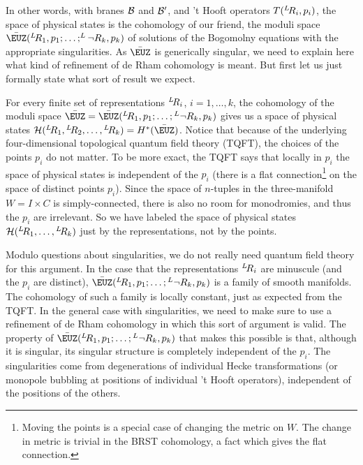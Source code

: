 In other words, with branes ${\cal B}$ and ${\cal B}'$, and 't
Hooft operators $T(^L\negthinspace R_i,p_i)$, the space of
physical states is the cohomology of our friend, the moduli space
$\bar\EUZ(^L\negthinspace R_1,p_1;\dots;^L\neg R_k,p_k)$ of solutions of the Bogomolny
equations with the appropriate singularities. As $\bar\EUZ$ is
generically singular, we need to explain here what kind of
refinement of de Rham cohomology is meant. But first let us just
formally state what sort of result we expect.

For every finite set of representations $^L\negthinspace R_i$,
$i=1,\dots,k$, the cohomology of the moduli space
$\bar\EUZ=\bar\EUZ(^L\negthinspace R_1,p_1;\dots;{}^L\neg R_k,p_k)$
 gives us a space of physical
states ${\cal H}({}^L\negthinspace R_1,{}^L\negthinspace
R_2,\dots,{}^L\negthinspace R_k)=H^*(\bar\EUZ)$.
Notice that because of the underlying four-dimensional
topological quantum field theory (TQFT), the choices of the points
$p_i$ do not matter.  To be more exact, the TQFT says that locally
in $p_i$ the space of physical states is independent of the $p_i$
(there is a flat connection\footnote{Moving the points is a special
case of changing the metric on $W$.  The change in metric is
trivial in the BRST cohomology, a fact which gives the flat
connection.} on the space of distinct points $p_i$). Since the
space of $n$-tuples in the three-manifold $W=I\times C$ is
simply-connected, there is also no room for monodromies, and thus
the $p_i$ are irrelevant. So we have labeled the space of physical
states ${\cal H}({}^L\negthinspace R_1,\dots,{}^L\negthinspace
R_k)$ just by the representations, not by the points.

Modulo questions about singularities, we do not really need
quantum field theory for this argument. In the case that the
representations $^L\negthinspace R_i$ are minuscule (and the $p_i$
are distinct), $\bar\EUZ(^L\negthinspace R_1,p_1;\dots;{}^L\neg R_k,p_k)$ is a family
of smooth manifolds. The cohomology of such a family is locally
constant, just as expected from the TQFT. In the general case with
singularities, we need to make sure to use a refinement of de Rham
cohomology in which this sort of argument is valid.  The property
of $\bar\EUZ(^L\negthinspace R_1,p_1;\dots;{}^L\neg R_k,p_k)$ that makes this possible
is that, although it is singular, its singular structure is
completely independent of the $p_i$.  The singularities come from
degenerations of individual Hecke transformations (or monopole
bubbling at positions of individual 't Hooft operators),
independent of the positions of the others.

